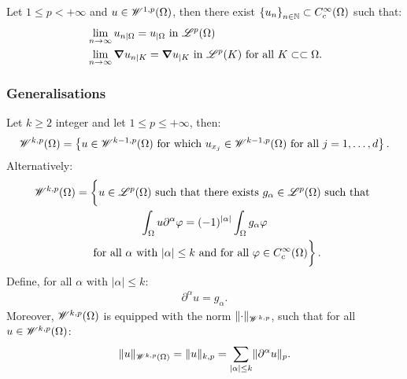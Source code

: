 \begin{theorem}
    Let $1 \leq p < +\infty$ and $u \in \mathscr{W}^{1, p}(\Omega)$, then there exist $\left\{ u_n \right\}_{n \in \mathbb{N}} \subset C_c^{\infty}(\Omega)$ such that:
    \begin{align}
        & \lim_{n \rightarrow \infty} u_{n \mid \Omega} = u_{\mid \Omega} \text { in } \mathscr{L}^{p}(\Omega)\\
        & \lim_{n \rightarrow \infty} \bm{\nabla} u_{n \mid K} = \bm{\nabla} u_{\mid K} \text { in } \mathscr{L}^{p}(K) \text{ for all } K \subset \subset \Omega.
    \end{align}
\end{theorem}

\subsubsection{Generalisations}

\begin{definition}
    Let $k \geq 2$ integer and let $1 \leq p \leq +\infty$, then:
    \begin{gather}
        \mathscr{W}^{k, p}(\Omega) = \left\{ u \in \mathscr{W}^{k - 1, p}(\Omega) \text{ for which } u_{x_j} \in \mathscr{W}^{k - 1, p}(\Omega) \text{ for all } j = 1, \dots, d \right\}.
    \end{gather}
    Alternatively:
    \begin{gather}
        \SpaceWkp{k}{p}(\Omega) = \left\{ \vphantom{\int_{\Omega}} u \in \SpaceLp{p}(\Omega) \text{ such that there exists } g_{\alpha} \in \SpaceLp{p}(\Omega) \text{ such that } \right. \notag \\ 
        \left. \int_{\Omega} u \partial^{\alpha} \varphi = (-1)^{\lvert \alpha \rvert} \int_{\Omega} g_{\alpha} \varphi \right. \notag \\
        \left. \text{ for all } \alpha \text{ with } \lvert \alpha \rvert \leq k \text{ and for all }\varphi \in C_c^{\infty}(\Omega) \vphantom{\int_{\Omega}} \right\}.
    \end{gather}
    Define, for all $\alpha \text{ with } \lvert \alpha \rvert \leq k$:
    \begin{gather}
        \partial^{\alpha} u = g_{\alpha}.
    \end{gather}
    Moreover, $\mathscr{W}^{k, p}(\Omega)$ is equipped with the norm $\lVert \cdot \rVert_{\mathscr{W}^{k, p}}$, such that for all $u \in \mathscr{W}^{k, p}(\Omega)$:
    \begin{gather}
        \lVert u \rVert_{\mathscr{W}^{k, p}(\Omega)} = \lVert u \rVert_{k, p} = \sum_{\lvert \alpha \rvert \leq k} \lVert \partial^{\alpha} u \rVert_p.
    \end{gather}
\end{definition}

